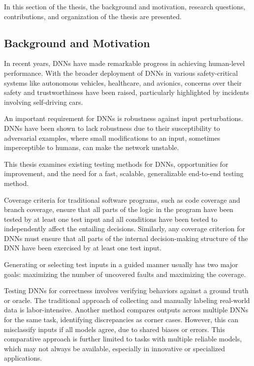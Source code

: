 In this section of the thesis, the background and motivation, research questions, contributions, and organization of the thesis are presented.

\subsection{Background and Motivation}

In recent years, DNNs have made remarkable progress in achieving human-level performance. With the broader deployment of DNNs in various safety-critical systems like autonomous vehicles, healthcare, and avionics, concerns over their safety and trustworthiness have been raised, particularly highlighted by incidents involving self-driving cars.

An important requirement for DNNs is robustness against input perturbations. DNNs have been shown to lack robustness due to their susceptibility to adversarial examples, where small modifications to an input, sometimes imperceptible to humans, can make the network unstable.

This thesis examines existing testing methods for DNNs, opportunities for improvement, and the need for a fast, scalable, generalizable end-to-end testing method.

Coverage criteria for traditional software programs, such as code coverage and branch coverage, ensure that all parts of the logic in the program have been tested by at least one test input and all conditions have been tested to independently affect the entailing decisions. Similarly, any coverage criterion for DNNs must ensure that all parts of the internal decision-making structure of the DNN have been exercised by at least one test input.

Generating or selecting test inputs in a guided manner usually has two major goals: maximizing the number of uncovered faults and maximizing the coverage.

Testing DNNs for correctness involves verifying behaviors against a ground truth or oracle. The traditional approach of collecting and manually labeling real-world data is labor-intensive. Another method compares outputs across multiple DNNs for the same task, identifying discrepancies as corner cases. However, this can misclassify inputs if all models agree, due to shared biases or errors. This comparative approach is further limited to tasks with multiple reliable models, which may not always be available, especially in innovative or specialized applications.

